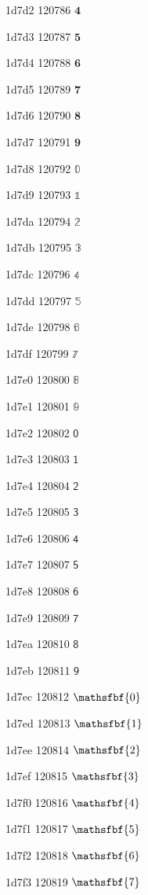 \documentclass[11pt]{article}
\begin{document}
1d7d2 120786 \ensuremath{\mathbf{4}}

1d7d3 120787 \ensuremath{\mathbf{5}}

1d7d4 120788 \ensuremath{\mathbf{6}}

1d7d5 120789 \ensuremath{\mathbf{7}}

1d7d6 120790 \ensuremath{\mathbf{8}}

1d7d7 120791 \ensuremath{\mathbf{9}}

1d7d8 120792 \ensuremath{\mathbb{0}}

1d7d9 120793 \ensuremath{\mathbb{1}}

1d7da 120794 \ensuremath{\mathbb{2}}

1d7db 120795 \ensuremath{\mathbb{3}}

1d7dc 120796 \ensuremath{\mathbb{4}}

1d7dd 120797 \ensuremath{\mathbb{5}}

1d7de 120798 \ensuremath{\mathbb{6}}

1d7df 120799 \ensuremath{\mathbb{7}}

1d7e0 120800 \ensuremath{\mathbb{8}}

1d7e1 120801 \ensuremath{\mathbb{9}}

1d7e2 120802 \ensuremath{\mathsf{0}}

1d7e3 120803 \ensuremath{\mathsf{1}}

1d7e4 120804 \ensuremath{\mathsf{2}}

1d7e5 120805 \ensuremath{\mathsf{3}}

1d7e6 120806 \ensuremath{\mathsf{4}}

1d7e7 120807 \ensuremath{\mathsf{5}}

1d7e8 120808 \ensuremath{\mathsf{6}}

1d7e9 120809 \ensuremath{\mathsf{7}}

1d7ea 120810 \ensuremath{\mathsf{8}}

1d7eb 120811 \ensuremath{\mathsf{9}}

1d7ec 120812 \ensuremath{\mathsfbf{0}}

1d7ed 120813 \ensuremath{\mathsfbf{1}}

1d7ee 120814 \ensuremath{\mathsfbf{2}}

1d7ef 120815 \ensuremath{\mathsfbf{3}}

1d7f0 120816 \ensuremath{\mathsfbf{4}}

1d7f1 120817 \ensuremath{\mathsfbf{5}}

1d7f2 120818 \ensuremath{\mathsfbf{6}}

1d7f3 120819 \ensuremath{\mathsfbf{7}}
\end{document}
